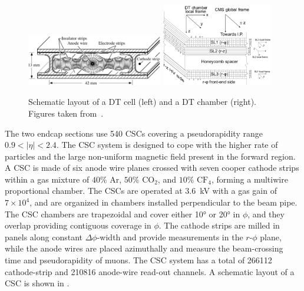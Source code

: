 \begin{figure}[!htbp]
 \begin{center}
  \includegraphics[width=0.53\textwidth]{Figures/Experiment/CMS/DT_2.png}
  \includegraphics[width=0.43\textwidth]{Figures/Experiment/CMS/DT_1.png}
 \end{center}
 \caption{Schematic layout of a DT cell (left) and a DT chamber (right). Figures taken from~\cite{CMSMuonDTFig}.}
 \label{fig:CMS_DT}
\end{figure}

The two endcap sections use 540 CSCs covering a pseudorapidity range $0.9 < |\eta| < 2.4$. The CSC system is designed to cope with the higher rate of particles and the large non-uniform magnetic field present in the forward region. A CSC is made of six anode wire planes crossed with seven cooper cathode strips within a gas mixture of $40\%$ Ar, $50\%$ $\mathrm{CO}_{2}$, and $10\%$ $\mathrm{CF}_{4}$, forming a multiwire proportional chamber. The CSCs are operated at \SI{3.6}{\kV} with a gas gain of $7{\times}10^{4}$, and are organized in chambers installed perpendicular to the beam pipe. The CSC chambers are trapezoidal and cover either \ang{10} or \ang{20} in $\phi$, and they overlap providing contiguous coverage in $\phi$. The cathode strips are milled in panels along constant $\Delta{\phi}$-width and provide measurements in the $r$-$\phi$ plane, while the anode wires are placed azimuthally and measure the beam-crossing time and pseudorapidity of muons. The CSC system has a total of 266112 cathode-strip and 210816 anode-wire read-out channels. A schematic layout of a CSC is shown in .

